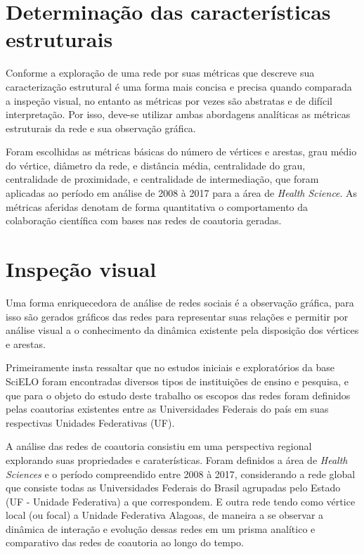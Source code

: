 \section{\textbf{Determinação das características estruturais}}

Conforme \citep{de2018exploratory} a exploração de uma rede por suas métricas que descreve sua caracterização estrutural é uma forma mais concisa e precisa quando comparada a inspeção visual, no entanto as métricas por vezes são abstratas e de difícil interpretação. Por isso, deve-se utilizar ambas abordagens analíticas as métricas estruturais da rede e sua observação gráfica.

Foram escolhidas as métricas básicas do número de vértices e arestas, grau médio do vértice, diâmetro da rede, e distância média, centralidade do grau, centralidade de proximidade, e centralidade de intermediação, que foram aplicadas ao período em análise de 2008 à 2017 para a área de \textit{Health Science}. As métricas aferidas denotam de forma quantitativa o comportamento da colaboração científica com bases nas redes de coautoria geradas.

\section{\textbf{Inspeção visual}}

Uma forma enriquecedora de análise de redes sociais é a observação gráfica, para isso são gerados gráficos das redes para representar suas relações e permitir por análise visual a o conhecimento da dinâmica existente pela disposição dos vértices e arestas.

Primeiramente insta ressaltar que no estudos iniciais e exploratórios da base SciELO foram encontradas diversos tipos de instituições de ensino e pesquisa, e que para o objeto do estudo deste trabalho os escopos das redes foram definidos pelas coautorias existentes entre as Universidades Federais do país em suas respectivas Unidades Federativas (UF). 

A análise das redes de coautoria consistiu em uma perspectiva regional explorando suas propriedades e caraterísticas. Foram definidos a área de \textit{Health Sciences} e o período compreendido entre 2008 à 2017, considerando a rede global que consiste todas as Universidades Federais do Brasil agrupadas pelo Estado (UF - Unidade Federativa) a que correspondem. E outra rede tendo como vértice local (ou focal) a Unidade Federativa Alagoas, de maneira a se observar a dinâmica de interação e evolução dessas redes em um prisma analítico e comparativo das redes de coautoria ao longo do tempo.

